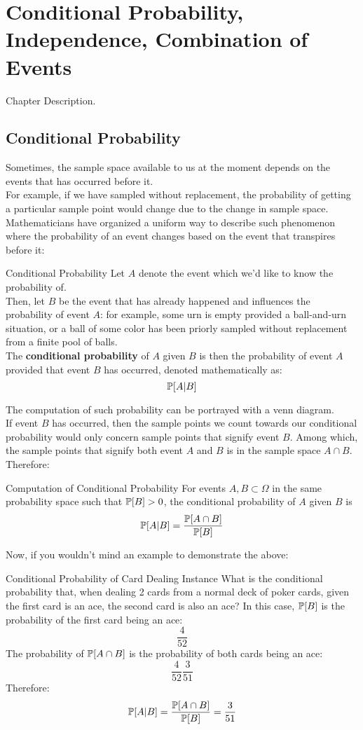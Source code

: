 \chapter{Conditional Probability, Independence, Combination of Events}
Chapter Description.

\section{Conditional Probability}
Sometimes, the sample space available to us at the moment depends on the events that has occurred before it. \\
For example, if we have sampled without replacement, the probability of getting a particular sample point would change due to the change in sample space. \\
Mathematicians have organized a uniform way to describe such phenomenon where the probability of an event changes based on the event that transpires before it:
\begin{ln-define}{Conditional Probability}{}
    Let $A$ denote the event which we'd like to know the probability of. \\
    Then, let $B$ be the event that has already happened and influences the probability of event $A$: for example, some urn is empty provided a ball-and-urn situation, or a ball of some color has been priorly sampled without replacement from a finite pool of balls. \\
    The \textbf{conditional probability} of $A$ given $B$ is then the probability of event $A$ provided that event $B$ has occurred, denoted mathematically as:
    \[\P[A|B]\]
\end{ln-define}
The computation of such probability can be portrayed with a venn diagram. \\
If event $B$ has occurred, then the sample points we count towards our conditional probability would only concern sample points that signify event $B$. Among which, the sample points that signify both event $A$ and $B$ is in the sample space $A \cap B$. \\
Therefore:
\begin{ln-define}{Computation of Conditional Probability}{}
    For events $A, B \subset \Omega$ in the same probability space such that $\P[B] > 0$, the conditional probability of $A$ given $B$ is
    \[\P[A|B] = \frac{\P[A \cap B]}{\P[B]}\]
\end{ln-define}
Now, if you wouldn't mind an example to demonstrate the above:
\begin{ln-quest}{Conditional Probability of Card Dealing Instance}{}
    What is the conditional probability that, when dealing 2 cards from a normal deck of poker cards, given the first card is an ace, the second card is also an ace?
    \tcblower
    In this case, $\P[B]$ is the probability of the first card being an ace:
    \[\frac{4}{52}\]
    The probability of $\P[A \cap B]$ is the probability of both cards being an ace:
    \[\frac{4}{52} \frac{3}{51}\]
    Therefore:
    \[\P[A|B] = \frac{\P[A \cap B]}{\P[B]} = \frac{3}{51}\]
\end{ln-quest}

